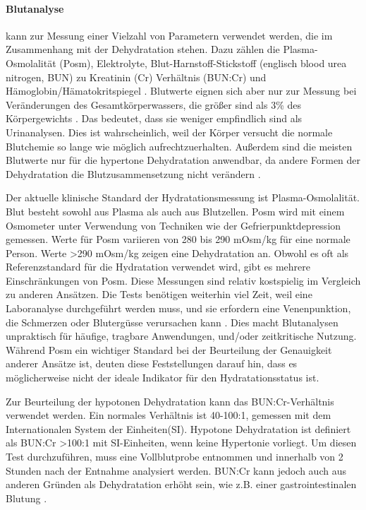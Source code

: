 \documentclass[10pt,a4paper,headinclude,twoside, plainheadsepline, open=right, numbers=noenddot, twocolumn]{article}
\begin{document}
\paragraph{Blutanalyse} kann zur Messung einer Vielzahl von Parametern verwendet werden, die im Zusammenhang mit der Dehydratation stehen.
Dazu zählen die Plasma-Osmolalität (Posm), Elektrolyte, Blut-Harnstoff-Stickstoff (englisch blood urea nitrogen, BUN) zu Kreatinin (Cr) Verhältnis (BUN:Cr) und Hämoglobin/Hämatokritspiegel \cite{oppliger2002hydration}.
Blutwerte eignen sich aber nur zur Messung bei Veränderungen des Gesamtkörperwassers, die größer sind als 3\% des Körpergewichts \cite{francesconi1987urinary}.
Das bedeutet, dass sie weniger empfindlich sind als Urinanalysen.
Dies ist wahrscheinlich, weil der Körper versucht die normale Blutchemie so lange wie möglich aufrechtzuerhalten.
Außerdem sind die meisten Blutwerte nur für die hypertone Dehydratation anwendbar, da andere Formen der Dehydratation die Blutzusammensetzung nicht verändern \cite{garret2018engineering}.

Der aktuelle klinische Standard der Hydratationsmessung ist Plasma-Osmolalität.
Blut besteht sowohl aus Plasma als auch aus Blutzellen.
Posm wird mit einem Osmometer unter Verwendung von Techniken wie der Gefrierpunktdepression gemessen.
Werte für Posm variieren von 280 bis 290 mOsm/kg für eine normale Person.
Werte >290 mOsm/kg zeigen eine Dehydratation an.
Obwohl es oft als Referenzstandard für die Hydratation verwendet wird, gibt es mehrere Einschränkungen von Posm.
Diese Messungen sind relativ kostspielig im Vergleich zu anderen Ansätzen.
Die Tests benötigen weiterhin viel Zeit, weil eine Laboranalyse durchgeführt werden muss, und sie erfordern eine Venenpunktion, die Schmerzen oder Blutergüsse verursachen kann \cite{armstrong1994urinary}. 
Dies macht Blutanalysen unpraktisch für häufige, tragbare Anwendungen, und/oder zeitkritische Nutzung. 
Während Posm ein wichtiger Standard bei der Beurteilung der Genauigkeit anderer Ansätze ist, deuten diese Feststellungen darauf hin, dass es möglicherweise nicht der ideale Indikator für den Hydratationsstatus ist\cite{garret2018engineering}.

Zur Beurteilung der hypotonen Dehydratation kann das BUN:Cr-Verhältnis verwendet werden. 
Ein normales Verhältnis ist 40-100:1, gemessen mit dem Internationalen System der Einheiten(SI).
Hypotone Dehydratation ist definiert als BUN:Cr >100:1 mit SI-Einheiten, wenn keine Hypertonie vorliegt.
Um diesen Test durchzuführen, muss eine Vollblutprobe entnommen und innerhalb von 2 Stunden nach der Entnahme analysiert werden.
BUN:Cr kann jedoch auch aus anderen Gründen als Dehydratation erhöht sein, wie z.B. einer gastrointestinalen Blutung \cite{garret2018engineering}.
\end{document}

